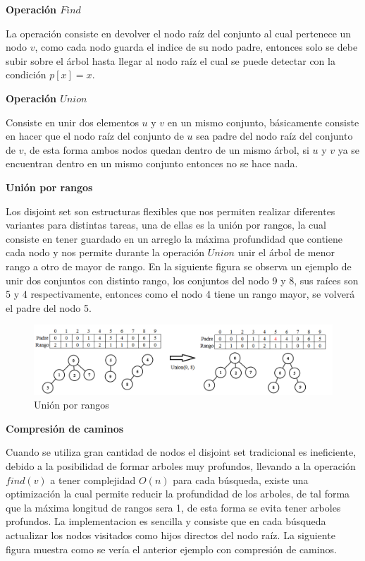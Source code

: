 \documentclass[12pt, a4paper]{article}
\newcommand\cppfile[2][]{

}
\newcommand{\subtitulo}[1]{\begin{center}\textbf{#1}\end{center}}
\begin{document}
	\subtitulo{Operación $Find$}
	
	La operación consiste en devolver el nodo raíz del conjunto al cual pertenece un nodo $v$, como cada nodo
	guarda el indice de su nodo padre, entonces solo se debe subir sobre el árbol hasta llegar al nodo raíz
	el cual se puede detectar con la condición $p[x]=x$.
	
	\subtitulo{Operación $Union$}
	
	Consiste en unir dos elementos $u$ y $v$ en un mismo conjunto, básicamente consiste en hacer que el nodo raíz 
	del conjunto de $u$ sea padre del nodo raíz del conjunto de $v$, de esta forma ambos nodos quedan dentro de un 
	mismo árbol, si $u$ y $v$ ya se encuentran dentro en un mismo conjunto entonces no se hace nada.

	\cppfile[7-27]{Estructuras_de_datos/codigos/disjoint_set_union_find.cpp}
	
	\subtitulo{Unión por rangos}
	
	Los disjoint set son estructuras flexibles que nos permiten realizar diferentes variantes para distintas tareas,
	una de ellas es la unión por rangos, la cual consiste en tener guardado en un arreglo la máxima
	profundidad que contiene cada nodo y nos permite durante la operación $Union$ unir el árbol de menor rango 
	a otro de mayor de rango. En la siguiente figura se observa un ejemplo de unir dos conjuntos con distinto rango,
	los conjuntos del nodo 9 y 8, sus raíces son 5 y 4 respectivamente, entonces como el nodo 4 tiene un rango mayor, 
	se volverá el padre del nodo 5.
	
	\begin{figure}[h!]
		\centering
		\includegraphics[scale=0.6]{Estructuras_de_datos/imagenes/disjoint_set/union_rango}
		\caption{Unión por rangos}
		\label{estructuras:disjoint_set:UnionRango}
	\end{figure}
	
	\cppfile[30-48]{Estructuras_de_datos/codigos/disjoint_set_union_find.cpp}
	
	\subtitulo{Compresión de caminos}
	
	Cuando se utiliza gran cantidad de nodos el disjoint set tradicional es ineficiente, debido a la posibilidad
	de formar arboles muy profundos, llevando a la operación $find(v)$ a tener complejidad $O(n)$ para cada 
	búsqueda, existe una optimización la cual permite reducir la profundidad de los arboles, de tal forma que la 
	máxima longitud de rangos sera 1, de esta forma se evita tener arboles profundos. La implementacion es sencilla
	y consiste que en cada búsqueda actualizar los nodos visitados como hijos directos del nodo raíz. La siguiente
	figura muestra como se vería el anterior ejemplo con compresión de caminos.
	
\end{document}
